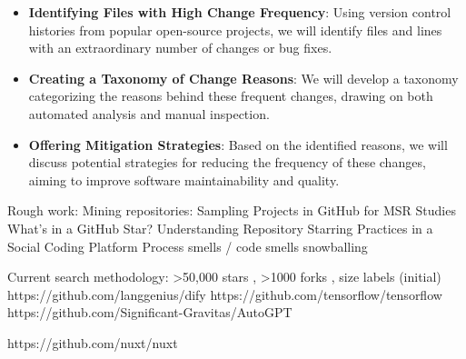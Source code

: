 \documentclass{article}
\begin{document}
\begin{itemize}

\item{\textbf{Identifying Files with High Change Frequency}: Using version control histories from popular open-source projects, we will identify files and lines with an extraordinary number of changes or bug fixes.}

\item{\textbf{Creating a Taxonomy of Change Reasons}: We will develop a taxonomy categorizing the reasons behind these frequent changes, drawing on both automated analysis and manual inspection.}

\item{\textbf{Offering Mitigation Strategies}: Based on the identified reasons, we will discuss potential strategies for reducing the frequency of these changes, aiming to improve software maintainability and quality.}
\end{itemize}

Rough work: 
Mining repositories: 
Sampling Projects in GitHub for MSR Studies
What’s in a GitHub Star? Understanding Repository Starring Practices in a Social Coding Platform
Process smells / code smells 
snowballing 

Current search methodology: >50,000 stars , >1000 forks , size labels (initial)
https://github.com/langgenius/dify
https://github.com/tensorflow/tensorflow
https://github.com/Significant-Gravitas/AutoGPT

https://github.com/nuxt/nuxt



\end{document}
